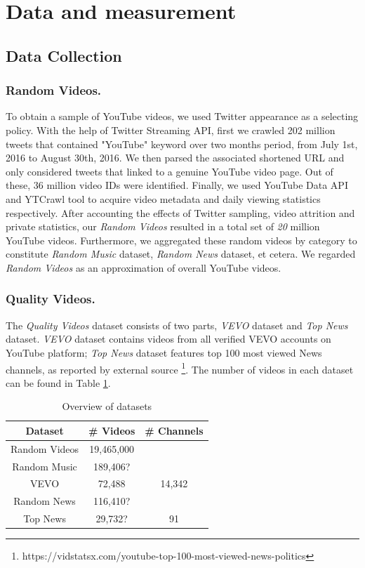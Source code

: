 \section{Data and measurement}

\subsection{Data Collection}

\subsubsection{Random Videos.} To obtain a sample of YouTube videos, we used Twitter appearance as a selecting policy. With the help of Twitter Streaming API, first we crawled 202 million tweets that contained "YouTube" keyword over two months period, from July 1st, 2016 to August 30th, 2016. We then parsed the associated shortened URL and only considered tweets that linked to a genuine YouTube video page. Out of these, 36 million video IDs were identified. Finally, we used YouTube Data API and YTCrawl tool \cite{Yu:2015lifecyle} to acquire video metadata and daily viewing statistics respectively. After accounting the effects of Twitter sampling, video attrition and private statistics, our \textit{Random Videos} resulted in a total set of \textit{20} million YouTube videos. Furthermore, we aggregated these random videos by category to constitute \textit{Random Music} dataset, \textit{Random News} dataset, et cetera. We regarded \textit{Random Videos} as an approximation of overall YouTube videos.

\subsubsection{Quality Videos.} The \textit{Quality Videos} dataset consists of two parts, \textit{VEVO} dataset and \textit{Top News} dataset. \textit{VEVO} dataset contains videos from all verified VEVO accounts on YouTube platform; \textit{Top News} dataset features top 100 most viewed News channels, as reported by external source \footnote{https://vidstatsx.com/youtube-top-100-most-viewed-news-politics}. The number of videos in each dataset can be found in Table \ref{table:1}.

\begin{table}[h!]
\centering
\begin{tabular}{|c||c|c|} 
 \hline
 Dataset & \# Videos & \# Channels \\ 
 \hline\hline
 Random Videos & 19,465,000 & \\ 
 Random Music & 189,406? & \\
 VEVO & 72,488 & 14,342 \\
 Random News & 116,410? & \\
 Top News & 29,732? & 91 \\ 
 \hline
\end{tabular}
\caption{Overview of datasets}
\label{table:1}
\end{table}


